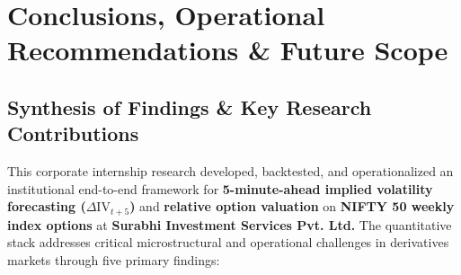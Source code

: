 \chapter{Conclusions, Operational Recommendations \& Future Scope}
\label{chap:conclusion}

\section{Synthesis of Findings \& Key Research Contributions}
\label{sec:synthesis_contributions}

This corporate internship research developed, backtested, and operationalized an institutional end-to-end framework for \textbf{5-minute-ahead implied volatility forecasting ($\Delta \text{IV}_{t+5}$)} and \textbf{relative option valuation} on \textbf{NIFTY 50 weekly index options} at \textbf{Surabhi Investment Services Pvt. Ltd.} The quantitative stack addresses critical microstructural and operational challenges in derivatives markets through five primary findings:

